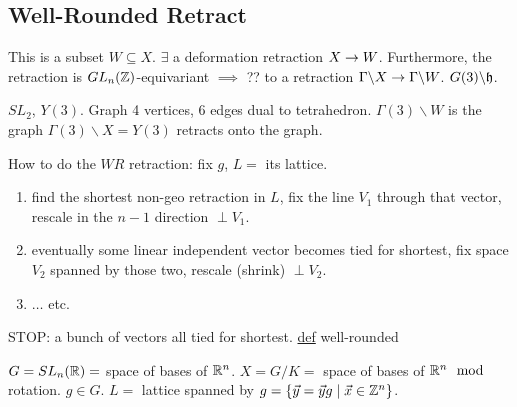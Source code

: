 \documentclass[]{article}
\begin{document}
\subsection*{Well-Rounded Retract}

This is a subset $W\subseteq X$. $\exists$ a deformation retraction $X\rightarrow W$. Furthermore, the retraction is $GL_n(\mathbb{Z})$-equivariant $\implies$ ?? to a retraction $\Gamma\backslash X \rightarrow \Gamma\backslash W$. $G(3)\backslash \frak{h}$.

\begin{example}
	$SL_2$, $Y(3)$. Graph 4 vertices, 6 edges dual to tetrahedron. $\Gamma(3)\backslash W$ is the graph $\Gamma(3)\backslash X = Y(3)$ retracts onto the graph.
\end{example}

How to do the $WR$ retraction: fix $g$, $L = $ its lattice.
\begin{enumerate}
	\item find the shortest non-geo retraction in $L$, fix the line $V_1$ through that vector, rescale in the $n-1$ direction $\perp V_1$.
	\item eventually some linear independent vector becomes tied for shortest, fix space $V_2$ spanned by those two, rescale (shrink) $\perp V_2$.
	\item $\dots$ etc.
\end{enumerate}
STOP: a bunch of vectors all tied for shortest. \ul{def} well-rounded

$G = SL_n(\mathbb{R}) = $ space of bases of $\mathbb{R}^n$. $X = G/K = $ space of bases of $\mathbb{R}^n \mod$ rotation. $g\in G$. $L = $ lattice spanned by $g = \{\vec{y} = \vec{y} g \mid \vec{x} \in \mathbb{Z}^n\}$.
\end{document}
